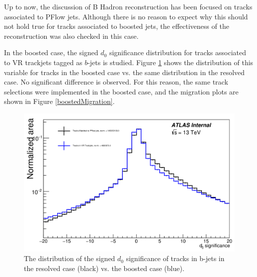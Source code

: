 \documentclass[10pt,a4paper]{book}
\begin{document}
Up to now, the discussion of B Hadron reconstruction has been focused on tracks associated to PFlow jets. Although there is no reason to expect why this should not hold true for tracks associated to boosted jets, the effectiveness of the reconstruction was also checked in this case.

In the boosted case, the signed $d_0$ significance distribution for tracks associated to VR trackjets tagged as $b$-jets is studied. Figure \ref{d0Boost} shows the distribution of this variable for tracks in the boosted case vs. the same distribution in the resolved case. No significant difference is observed. For this reason, the same track selections were implemented in the boosted case, and the migration plots are shown in Figure \ref{boostedMigration}. 

\begin{figure}
    \centering
    \includegraphics[width=0.9\linewidth]{analysis-chapter/d0Boosted.png}
    \caption{The distribution of the signed $d_0$ significance of tracks in b-jets in the resolved case (black) vs. the boosted case (blue).}
    \label{d0Boost}
\end{figure}
\end{document}
